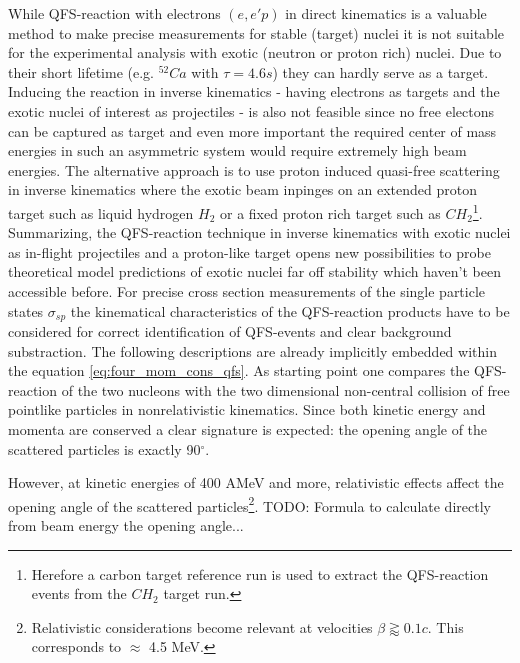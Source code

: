 While QFS-reaction with electrons $(e,e'p)$ in direct kinematics is a valuable method to make precise measurements for stable (target) nuclei it is not suitable for the experimental analysis with exotic (neutron or proton rich) nuclei. Due to their short lifetime (e.g. $^{52}Ca$ with $\tau = 4.6s$) they can hardly serve as a target. Inducing the reaction in inverse kinematics - having electrons as targets and the exotic nuclei of interest as projectiles - is also not feasible since no free electons can be captured as target and even more important the required center of mass energies in such an asymmetric system would require extremely high beam energies. The alternative approach is to use proton induced quasi-free scattering in inverse kinematics where the exotic beam inpinges on an extended proton target such as liquid hydrogen $H_2$  or a fixed proton rich target such as $CH_2$\footnote{Herefore a carbon target reference run is used to extract the QFS-reaction events from the $CH_2$ target run.}.\newline
Summarizing, the QFS-reaction technique in inverse kinematics with exotic nuclei as in-flight projectiles and a proton-like target opens new possibilities to probe theoretical model predictions of exotic nuclei far off stability which haven't been accessible before.\newline
For precise cross section measurements of the single particle states $\sigma_{sp}$ the kinematical characteristics of the QFS-reaction products have to be considered for correct identification of QFS-events and clear background substraction. The following descriptions are already implicitly embedded within the equation \ref{eq:four_mom_cons_qfs}.\newline
As starting point one compares the QFS-reaction of the two nucleons with the two dimensional non-central collision of free pointlike particles in nonrelativistic kinematics. Since both kinetic energy and momenta are conserved a  clear signature is expected: the opening angle of the scattered particles is exactly 90$^{\circ}$. 

However, at kinetic energies of 400 AMeV and more, relativistic effects affect the opening angle of the scattered particles\footnote{Relativistic considerations become relevant at velocities $ \beta \gtrapprox 0.1 c$. This corresponds to $\approx$ 4.5 MeV.}. 
TODO: Formula to calculate directly from beam energy the opening angle...

